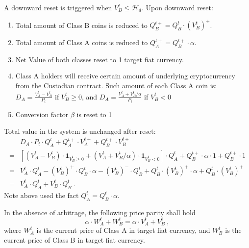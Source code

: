 \documentclass[final,pdftex]{ectaart}
\theoremstyle{plain}
\begin{document}
\begin{appendices}
A downward reset is triggered when $V_{B}^{t}\leqslant\mathcal{H}_{d}$. Upon downward reset:
\begin{enumerate}
\item Total amount of Class B coins is reduced to $Q_{B}^{t+}=Q_{B}^{t}\cdot (V_{B}^{t})^+$.
\item Total amount of Class A coins is reduced to $Q_{A}^{t+}=Q_{B}^{t+}\cdot\alpha$.
\item Net Value of both classes reset to 1 target fiat currency.
\item Class A holders will receive certain amount of underlying cryptocurrency from the Custodian contract. Such amount of each Class A coin is: $D_{A}=\frac{V_{A}^{t}-V_{B}^{t}}{P_{t}}$ if $V_B^t\ge 0$, and $D_{A}=\frac{V_{A}^{t}+V_{B}^{t}/\alpha}{P_{t}}$ if $V_B^t< 0$
\item Conversion factor $\beta$ is reset to 1
\end{enumerate}
Total value in the system is unchanged after reset:
\begin{align*}
 & D_{A}\cdot P_{t}\cdot Q_{A}^{t}+Q_{A}^{t+}\cdot V_{A}^{t+}+Q_{B}^{t+}\cdot V_{B}^{t+}\\
= & \left[\left(V_{A}^{t}-V_{B}^{t}\right)\cdot\mathbf{1}_{V_B^t\ge 0}+\left(V_{A}^{t}+V_{B}^{t}/\alpha\right)\cdot\mathbf{1}_{V_B^t< 0}\right]\cdot Q_{A}^{t}+Q_{B}^{t+}\cdot\alpha\cdot1+Q_{B}^{t+}\cdot1\\
= & V_{A}^{t}\cdot Q_{A}^{t}-(V_{B}^{t})^+\cdot Q_{B}^{t}\cdot\alpha-(V_{B}^{t})^-\cdot Q_{B}^{t}+Q_{B}^{t}\cdot (V_{B}^{t})^+\cdot\alpha+Q_{B}^{t}\cdot (V_{B}^{t})^+\\
= & V_{A}^{t}\cdot Q_{A}^{t}+V_{B}^{t}\cdot Q_{B}^{t}\ .
\end{align*}
Note above used the fact $Q_{A}^{t}=Q_{B}^{t}\cdot\alpha$.




In the absence of arbitrage, the following price parity shall hold
\[
\alpha\cdot W_{A}^{t}+W_{B}^{t}=\alpha\cdot V_{A}^{t}+V_{B}^{t}\ ,
\]
where $W_{A}^{t}$ is the current price of Class A in target fiat currency, and $W_{B}^{t}$ is the current price of Class B in target fiat currency.


\end{appendices}
\end{document}
